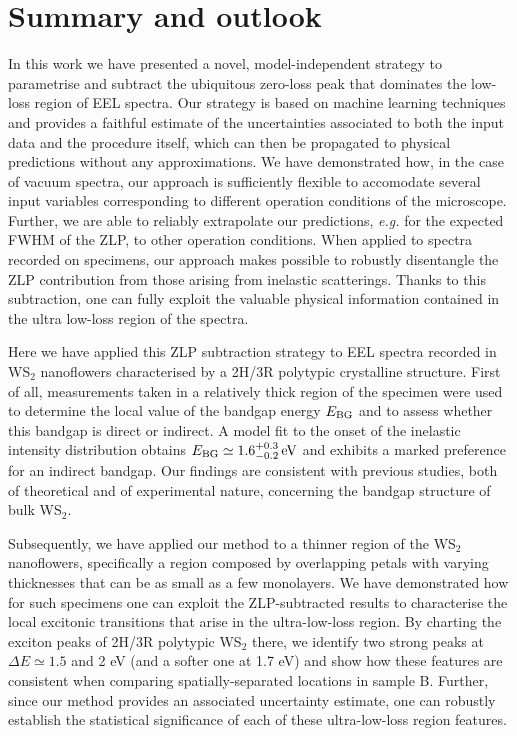 \section{Summary and outlook}
\label{sec:summary}

In this work we have presented a novel, model-independent strategy to parametrise and subtract
the ubiquitous zero-loss peak that dominates  the low-loss region
of EEL spectra.
%
Our strategy is based on machine learning techniques and provides a faithful estimate of the
uncertainties associated to both the input data and the procedure itself,
which can  then be propagated to physical predictions  without any  approximations.
%
We have demonstrated how, in the case of vacuum spectra, our approach
is sufficiently flexible to accomodate several input variables corresponding
to different operation conditions of the microscope.
%
Further, we are able  to reliably
extrapolate our predictions, {\it e.g.} for the  expected FWHM of the ZLP,
to other operation conditions.
%
When applied to spectra recorded on specimens, our approach
makes possible to robustly disentangle the ZLP contribution from
those arising from inelastic scatterings.
%
Thanks to this subtraction, one can fully exploit
the valuable physical information contained in the ultra low-loss region of
the spectra.

Here we have applied this ZLP subtraction
strategy to EEL spectra recorded in  WS$_2$ nanoflowers characterised by a
2H/3R polytypic crystalline structure.
%
First of all, measurements taken in a relatively
thick region of the specimen were used to determine
the local value of the bandgap energy $E_{\rm BG}$
and to assess whether this bandgap is direct or indirect.
%
A model fit to the onset of the inelastic intensity distribution obtains
$E_{\rm BG} \simeq 1.6^{+0.3}_{-0.2}\,{\rm eV}$ and exhibits a marked preference for an indirect bandgap.
%
Our findings are consistent with previous studies, both of theoretical
and of experimental nature, concerning the bandgap structure of bulk WS$_2$.

Subsequently, we have applied our method to a  thinner region of the  WS$_2$ nanoflowers,
specifically a region composed by overlapping petals with varying
thicknesses that can be as small as a few monolayers.
%
We have demonstrated how for such specimens one can exploit the ZLP-subtracted results
to characterise the local excitonic transitions that arise in the ultra-low-loss region.
%
By charting the exciton peaks of 2H/3R polytypic WS$_2$ there,
we identify two strong peaks at $\Delta E\simeq 1.5$ and 2 eV
(and a softer one at 1.7 eV) and show how
these features are consistent when comparing
spatially-separated locations in sample B.
%
Further, since our method provides an associated uncertainty estimate,
one can robustly establish the
statistical significance of each of these
ultra-low-loss region features.

